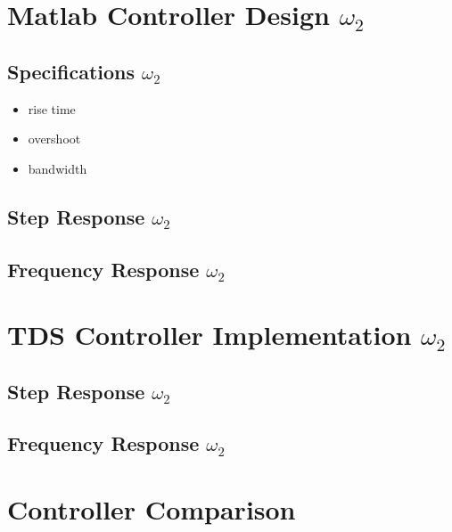 \documentclass[11pt,titlepage]{article}
\begin{document}
\section{Matlab Controller Design $\omega_2$}
	
	\subsection{Specifications $\omega_2$}
		\begin{itemize}
			\item rise time
			\item overshoot
			\item bandwidth
		\end{itemize}

	\subsection{Step Response $\omega_2$}

	\subsection{Frequency Response $\omega_2$}

\section{TDS Controller Implementation $\omega_2$}

	\subsection{Step Response $\omega_2$}

	\subsection{Frequency Response $\omega_2$}

\section{Controller Comparison}
\end{document}
